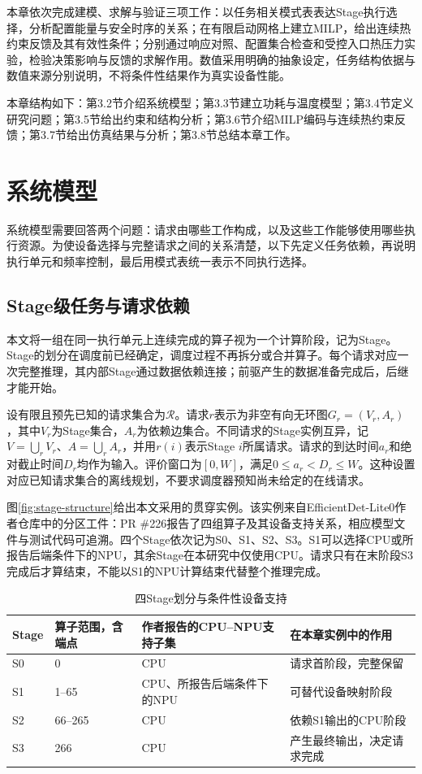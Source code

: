 本章依次完成建模、求解与验证三项工作：以任务相关模式表表达Stage执行选择，分析配置能量与安全时序的关系；在有限启动网格上建立MILP，给出连续热约束反馈及其有效性条件；分别通过响应对照、配置集合检查和受控入口热压力实验，检验决策影响与反馈的求解作用。数值采用明确的抽象设定，任务结构依据与数值来源分别说明，不将条件性结果作为真实设备性能。

本章结构如下：第3.2节介绍系统模型；第3.3节建立功耗与温度模型；第3.4节定义研究问题；第3.5节给出约束和结构分析；第3.6节介绍MILP编码与连续热约束反馈；第3.7节给出仿真结果与分析；第3.8节总结本章工作。

\section{系统模型}

系统模型需要回答两个问题：请求由哪些工作构成，以及这些工作能够使用哪些执行资源。为使设备选择与完整请求之间的关系清楚，以下先定义任务依赖，再说明执行单元和频率控制，最后用模式表统一表示不同执行选择。

\subsection{Stage级任务与请求依赖}

本文将一组在同一执行单元上连续完成的算子视为一个计算阶段，记为Stage。Stage的划分在调度前已经确定，调度过程不再拆分或合并算子。每个请求对应一次完整推理，其内部Stage通过数据依赖连接；前驱产生的数据准备完成后，后继才能开始。

设有限且预先已知的请求集合为\(\mathcal R\)。请求\(r\)表示为非空有向无环图\(G_r=(V_r,A_r)\)，其中\(V_r\)为Stage集合，\(A_r\)为依赖边集合。不同请求的Stage实例互异，记\(V=\bigcup_r V_r\)、\(A=\bigcup_r A_r\)，并用\(r(i)\)表示Stage \(i\)所属请求。请求的到达时间\(a_r\)和绝对截止时间\(D_r\)均作为输入。评价窗口为\([0,W]\)，满足\(0\le a_r<D_r\le W\)。这种设置对应已知请求集合的离线规划，不要求调度器预知尚未给定的在线请求。

图\ref{fig:stage-structure}给出本文采用的贯穿实例。该实例来自EfficientDet-Lite0作者仓库中的分区工件：PR \#226报告了四组算子及其设备支持关系\cite{source3}，相应模型文件与测试代码可追溯\cite{source4,source5}。四个Stage依次记为S0、S1、S2、S3。S1可以选择CPU或所报告后端条件下的NPU，其余Stage在本研究中仅使用CPU。请求只有在末阶段S3完成后才算结束，不能以S1的NPU计算结束代替整个推理完成。

\begin{table}[!htbp]
\centering\small
\caption{四Stage划分与条件性设备支持}\label{tab:stage-support}
\begin{tabular}{@{}p{2.0cm}p{2.8cm}p{4.0cm}p{4.5cm}@{}}
\toprule
Stage & 算子范围，含端点 & 作者报告的CPU--NPU支持子集 & 在本章实例中的作用 \\
\midrule
S0 & 0 & CPU & 请求首阶段，完整保留 \\
S1 & 1--65 & CPU、所报告后端条件下的NPU & 可替代设备映射阶段 \\
S2 & 66--265 & CPU & 依赖S1输出的CPU阶段 \\
S3 & 266 & CPU & 产生最终输出，决定请求完成 \\
\bottomrule
\end{tabular}
\end{table}

